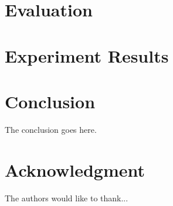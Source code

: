 \documentclass[journal]{IEEEtran}
\begin{document}
  
\section{Evaluation}\label{sec:evaluation}
\section{Experiment Results}\label{sec:experiment-results}
\section{Conclusion}\label{sec:conclusion}
The conclusion goes here.



\appendices
\section*{Acknowledgment}


The authors would like to thank...






\end{document}
